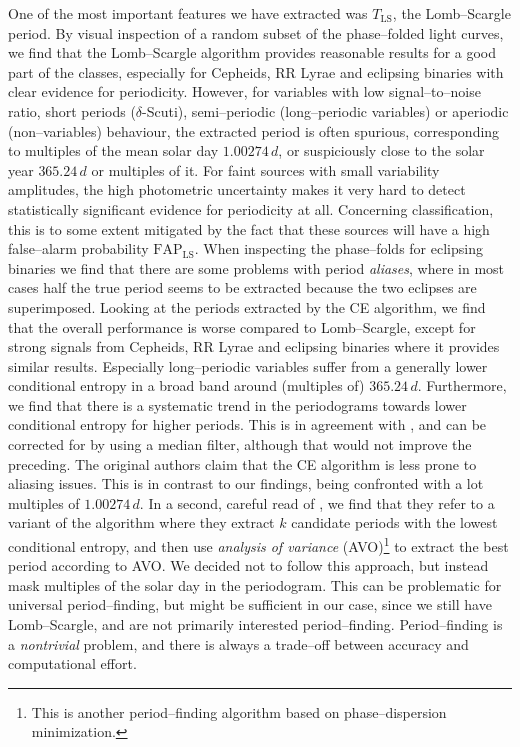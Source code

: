 One of the most important features we have extracted was $T_\text{LS}$, the Lomb--Scargle period. By visual inspection of a random subset of the phase--folded light curves, we find that the Lomb--Scargle algorithm provides reasonable results for a good part of the classes, especially for Cepheids, RR Lyrae and eclipsing binaries with clear evidence for periodicity. However, for variables with low signal--to--noise ratio, short periods ($\delta$-Scuti), semi--periodic (long--periodic variables) or aperiodic (non--variables) behaviour, the extracted period is often spurious, \eg corresponding to multiples of the mean solar day $1.00274 \, \unit{d}$, or suspiciously close to the solar year $365.24 \, \unit{d}$ or multiples of it. For faint sources with small variability amplitudes, the high photometric uncertainty makes it very hard to detect statistically significant evidence for periodicity at all. Concerning classification, this is to some extent mitigated by the fact that these sources will have a high false--alarm probability $\text{FAP}_\text{LS}$. When inspecting the phase--folds for eclipsing binaries we find that there are some problems with period \emph{aliases}, where in most cases half the true period seems to be extracted because the two eclipses are superimposed. Looking at the periods extracted by the CE algorithm, we find that the overall performance is worse compared to Lomb--Scargle, except for strong signals from Cepheids, RR Lyrae and eclipsing binaries where it provides similar results. Especially long--periodic variables suffer from a generally lower conditional entropy in a broad band around (multiples of) $365.24 \, \unit{d}$. Furthermore, we find that there is a systematic trend in the periodograms towards lower conditional entropy for higher periods. This is in agreement with \citet{graham2013}, and can be corrected for \eg by using a median filter, although that would not improve the preceding. The original authors claim that the CE algorithm is less prone to aliasing issues. This is in contrast to our findings, being confronted with a lot multiples of $1.00274 \, \unit{d}$. In a second, careful read of \citet{graham2013}, we find that they refer to a variant of the algorithm where they extract $k$ candidate periods with the lowest conditional entropy, and then use \emph{analysis of variance} (AVO)\footnote{This is another period--finding algorithm based on phase--dispersion minimization.} \citep{schwarzenberg1999} to extract the best period according to AVO. We decided not to follow this approach, but instead mask multiples of the solar day in the periodogram. This can be problematic for universal period--finding, but might be sufficient in our case, since we still have Lomb--Scargle, and are not primarily interested period--finding. Period--finding is a \emph{nontrivial} problem, and there is always a trade--off between accuracy and computational effort.\\

